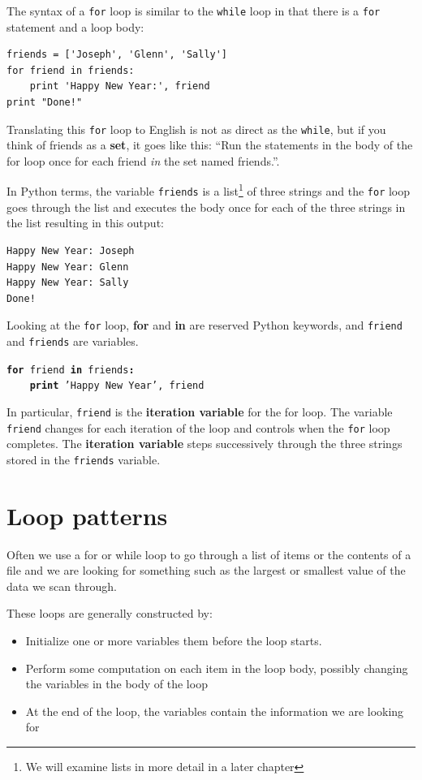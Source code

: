 \documentclass[10pt]{book}
\begin{document}
The syntax of a {\tt for} loop is similar to the {\tt while} loop
in that there is a {\tt for} statement and a loop body:

\beforeverb
\begin{verbatim}
friends = ['Joseph', 'Glenn', 'Sally']
for friend in friends:
    print 'Happy New Year:', friend
print "Done!"
\end{verbatim}
\afterverb
%
Translating this {\tt for} loop to English is not as direct as the 
{\tt while}, but if you think of friends as a {\bf set},
it goes like this: ``Run the statements in the body of the 
for loop once for each friend {\em in} the set named friends.''.

In Python terms, 
the variable {\tt friends} is a list\footnote{We will 
examine lists in more detail in a later chapter} 
of three strings and the {\tt for}
loop goes through the list and executes the body once
for each of the three strings in the list resulting in this output:

\beforeverb
\begin{verbatim}
Happy New Year: Joseph
Happy New Year: Glenn
Happy New Year: Sally
Done!
\end{verbatim}
\afterverb
%
Looking at the {\tt for} loop, {\bf for} and {\bf in} are reserved
Python keywords, and {\tt friend} and {\tt friends} are variables.

{\tt {\bf for} friend {\bf in} friends{\bf :}\\
\verb"    "{\bf print} 'Happy New Year', friend }

In particular, {\tt friend} is the {\bf iteration variable} for 
the for loop.  The variable {\tt friend} changes for each iteration of
the loop and controls when the {\tt for} loop completes.  The 
{\bf iteration variable} steps successively through the 
three strings stored in the {\tt friends} variable.


\section{Loop patterns}

Often we use a for or while loop to go through a list of items
or the contents of a file and we are looking for something such as
the largest or smallest value of the data we scan through.

These loops are generally constructed by:

\begin{itemize}

\item Initialize one or more variables them before the loop starts.

\item Perform some computation on each item in the loop body, 
possibly changing the variables in the body of the loop

\item At the end of the loop, the variables contain the information
we are looking for

\end{itemize}
\end{document}

